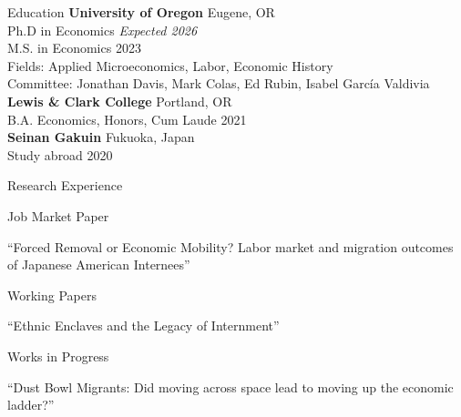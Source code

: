 \documentclass[
	11pt, %
]{resume} %
\begin{document}

\begin{rSection}{Education}
  \textbf{University of Oregon} \hfill Eugene, OR \\ 
  Ph.D in Economics \hfill \textit{Expected 2026} \\
  M.S. in Economics \hfill 2023 \\
  Fields: Applied Microeconomics, Labor, Economic History \\
  Committee: Jonathan Davis, Mark Colas, Ed Rubin, Isabel Garc\'{i}a Valdivia \\
  \textbf{Lewis \& Clark College} \hfill Portland, OR \\
  B.A. Economics, Honors, Cum Laude \hfill 2021 \\
  \textbf{Seinan Gakuin} \hfill Fukuoka, Japan \\
  Study abroad \hfill 2020 \\
\end{rSection}


\begin{rSection}{Research Experience}
  \begin{rSubsection}{Job Market Paper}{}{}{}
  \item ``Forced Removal or Economic Mobility? Labor market and migration outcomes of Japanese American Internees''
  \end{rSubsection}
  \begin{rSubsection}{Working Papers}{}{}{}
  \item ``Ethnic Enclaves and the Legacy of Internment''
  \end{rSubsection}
  \begin{rSubsection}{Works in Progress}{}{}{}
  \item ``Dust Bowl Migrants: Did moving across space lead to moving up the economic ladder?''
  \end{rSubsection}
\end{rSection}
\end{document}
